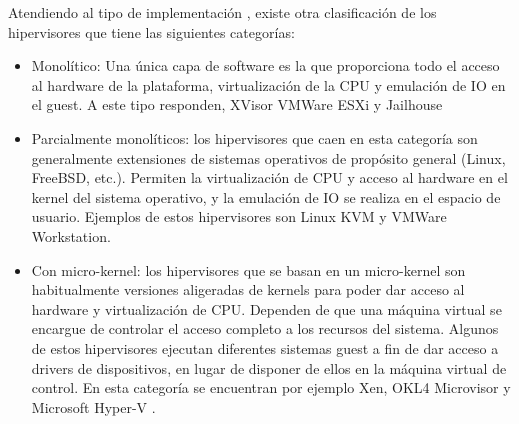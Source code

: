Atendiendo al tipo de implementación , existe otra clasificación de los hipervisores \cite{xvisor} que tiene las siguientes categorías:
\begin{itemize}
	\item Monolítico: Una única capa de software es la que proporciona todo el acceso al hardware de la plataforma, virtualización de la CPU y emulación de IO en el guest. A este tipo responden, XVisor VMWare ESXi \cite{vmware} y Jailhouse \cite{jailhouse_github}
	\item Parcialmente monolíticos: los hipervisores que caen en esta categoría son generalmente extensiones de sistemas operativos de propósito general (Linux, FreeBSD, etc.). Permiten la virtualización de CPU y acceso al hardware en el kernel del sistema operativo, y la emulación de IO se realiza en el espacio de usuario. Ejemplos de estos hipervisores son Linux KVM y VMWare Workstation.
	\item Con micro-kernel: los hipervisores que se basan en un micro-kernel son habitualmente versiones aligeradas de kernels para poder dar acceso al hardware y virtualización de CPU. Dependen de que una máquina virtual se encargue de controlar el acceso completo a los recursos del sistema. Algunos de estos hipervisores ejecutan diferentes sistemas guest a fin de dar acceso a drivers de dispositivos, en lugar de disponer de ellos en la máquina virtual de control. En esta categoría se encuentran por ejemplo Xen, OKL4 Microvisor \cite{okl4} y Microsoft Hyper-V \cite{hyper-v}.
\end{itemize}

\newpage
